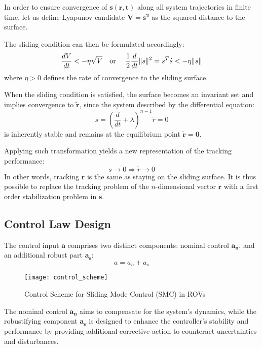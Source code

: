     In order to ensure convergence of $\mathbf{s(r, t)}$ along all system trajectories in finite time, 
    let us define Lyapunov candidate $\mathbf{V = s^2}$ as the squared distance to the surface.
    
    The sliding condition can then be formulated accordingly:
    \begin{equation}
    \frac{dV}{dt} < -\eta \sqrt{V} \text{\quad or \quad}
    \frac{1}{2}\frac{d}{dt}\|s\|^2 = s^T\dot{s} < -\eta \|s\|
    \label{eq::sliding}
    \end{equation}
    where $\eta>0$ defines the rate of convergence to the sliding surface.

    When the sliding condition is satisfied, the surface becomes an invariant set
    and implies convergence to $\mathbf{\tilde{r}}$, since the system described by 
    the differential equation:
    \begin{equation}
        s = (\frac{d}{dt} + \lambda)^{n-1}\tilde r = 0
    \end{equation}
    is inherently stable and remains at the equilibrium point $\mathbf{\tilde{r} = 0}$.

    Applying such transformation yields a new representation of the tracking performance:
    \begin{equation}
        s \rightarrow 0 \Rightarrow \tilde{r} \rightarrow 0
    \end{equation}
    In other words, tracking $\mathbf{r}$ is the same as staying on the sliding surface. 
    It is thus possible to replace the tracking problem of the $n$-dimensional vector 
    $\mathbf{r}$ with a first order stabilization problem in $\mathbf{s}$.

\subsection{Control Law Design}

    The control input $\mathbf{a}$ comprises two distinct components: 
    nominal control $\mathbf{a_n}$, 
    and an additional robust part $\mathbf{a_s}$: 
    \begin{equation}
        a = a_n + a_s
    \end{equation}
    \begin{figure}[H]
        \centering\texttt{[image: control\_scheme]}
        \caption{Control Scheme for Sliding Mode Control (SMC) in ROVs}
        \label{image:control_scheme}
    \end{figure}
    The nominal control $\mathbf{a_n}$ aims to compensate for the system's dynamics, 
    while the robustifying component $\mathbf{a_s}$ is designed to enhance the 
    controller's stability and performance by providing additional corrective 
    action to counteract uncertainties and disturbances.

